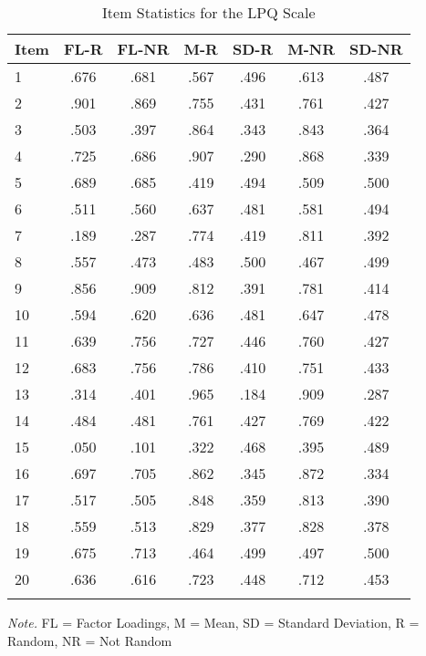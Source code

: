 \documentclass[english,man, mask]{apa6}
\theoremstyle{definition}
\theoremstyle{definition}
\theoremstyle{definition}
\theoremstyle{remark}
\begin{document}
\begin{table}[tbp]
\begin{center}
\begin{threeparttable}
\caption{\label{tab:Ltable}Item Statistics for the LPQ Scale}
\begin{tabular}{lcccccc}
\toprule
Item & \multicolumn{1}{c}{FL-R} & \multicolumn{1}{c}{FL-NR} & \multicolumn{1}{c}{M-R} & \multicolumn{1}{c}{SD-R} & \multicolumn{1}{c}{M-NR} & \multicolumn{1}{c}{SD-NR}\\
\midrule
1 & .676 & .681 & .567 & .496 & .613 & .487\\
2 & .901 & .869 & .755 & .431 & .761 & .427\\
3 & .503 & .397 & .864 & .343 & .843 & .364\\
4 & .725 & .686 & .907 & .290 & .868 & .339\\
5 & .689 & .685 & .419 & .494 & .509 & .500\\
6 & .511 & .560 & .637 & .481 & .581 & .494\\
7 & .189 & .287 & .774 & .419 & .811 & .392\\
8 & .557 & .473 & .483 & .500 & .467 & .499\\
9 & .856 & .909 & .812 & .391 & .781 & .414\\
10 & .594 & .620 & .636 & .481 & .647 & .478\\
11 & .639 & .756 & .727 & .446 & .760 & .427\\
12 & .683 & .756 & .786 & .410 & .751 & .433\\
13 & .314 & .401 & .965 & .184 & .909 & .287\\
14 & .484 & .481 & .761 & .427 & .769 & .422\\
15 & .050 & .101 & .322 & .468 & .395 & .489\\
16 & .697 & .705 & .862 & .345 & .872 & .334\\
17 & .517 & .505 & .848 & .359 & .813 & .390\\
18 & .559 & .513 & .829 & .377 & .828 & .378\\
19 & .675 & .713 & .464 & .499 & .497 & .500\\
20 & .636 & .616 & .723 & .448 & .712 & .453\\
\bottomrule
\addlinespace
\end{tabular}
\begin{tablenotes}[para]
\textit{Note.} FL = Factor Loadings, M = Mean, SD = Standard Deviation, R = Random, NR = Not Random
\end{tablenotes}
\end{threeparttable}
\end{center}
\end{table}
\end{document}

